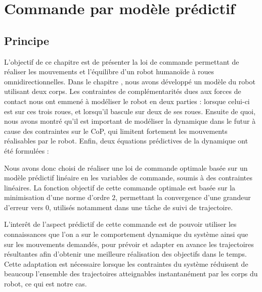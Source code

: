 \chapter{Commande par modèle prédictif}
\label{chapitre.commande}
	\section{Principe}
	
		L'objectif de ce chapitre est de présenter la loi de commande permettant de réaliser les mouvements et l'équilibre d'un robot humanoïde à roues omnidirectionnelles.
		Dans le chapitre , nous avons développé un modèle du robot utilisant deux corps.
		Les contraintes de complémentarités dues aux forces de contact nous ont emmené à modéliser le robot en deux parties : lorsque celui-ci est sur ces trois roues, et lorsqu'il bascule sur deux de ses roues.
		Ensuite de quoi, nous avons montré qu'il est important de modéliser la dynamique dans le futur à cause des contraintes sur le CoP, qui limitent fortement les mouvements réalisables par le robot.
		Enfin, deux équations prédictives de la dynamique ont été formulées :
		
		Nous avons donc choisi de réaliser une loi de commande optimale basée sur un modèle prédictif linéaire en les variables de commande, soumis à des contraintes linéaires.
		La fonction objectif de cette commande optimale est basée sur la minimisation d'une norme d'ordre $2$, permettant la convergence d'une grandeur d'erreur vers $0$, utilisés notamment dans une tâche de suivi de trajectoire.
		
		L'interêt de l'aspect prédictif de cette commande est de pouvoir utiliser les connaissances que l'on a sur le comportement dynamique du système ainsi que sur les mouvements demandés, pour prévoir et adapter en avance les trajectoires résultantes
		afin d'obtenir une meilleure réalisation des objectifs dans le temps. 
		Cette adaptation est nécessaire lorsque les contraintes du système réduisent de beaucoup l'ensemble des trajectoires atteignables instantanément par les corps du robot, ce qui est notre cas.
	
